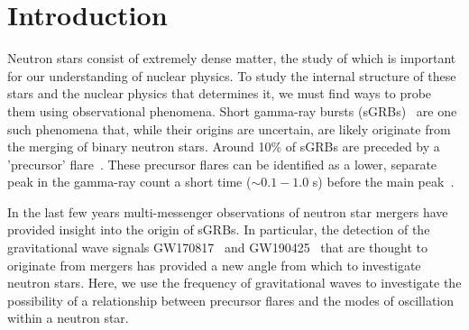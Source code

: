 \documentclass[fleqn,usenatbib]{mnras}
\begin{document}



 

\section{Introduction}
\hspace{\parindent}Neutron stars consist of extremely dense matter, the study of which is important for our understanding of nuclear physics. To study the internal structure of these stars and the nuclear physics that determines it, we must find ways to probe them using observational phenomena. Short gamma-ray bursts (sGRBs)~\cite{d2015short} are one such phenomena that, while their origins are uncertain, are likely originate from the merging of binary neutron stars. Around 10\% of sGRBs are preceded by a 'precursor' flare~\cite{troja2010precursors}. These precursor flares can be identified as a lower, separate peak in the gamma-ray count a short time ($\sim 0.1-1.0$ s) before the main peak~\cite{zhong2019precursors}. 

\hspace{\parindent}In the last few years multi-messenger observations of neutron star mergers have provided insight into the origin of sGRBs. In particular, the detection of the gravitational wave signals GW170817~\cite{abbott2017merger} and GW190425~\cite{abbott2020gw190425} that are thought to originate from mergers has provided a new angle from which to investigate neutron stars. Here, we use the frequency of gravitational waves to investigate the possibility of a relationship between precursor flares and the modes of oscillation within a neutron star.
\end{document}
